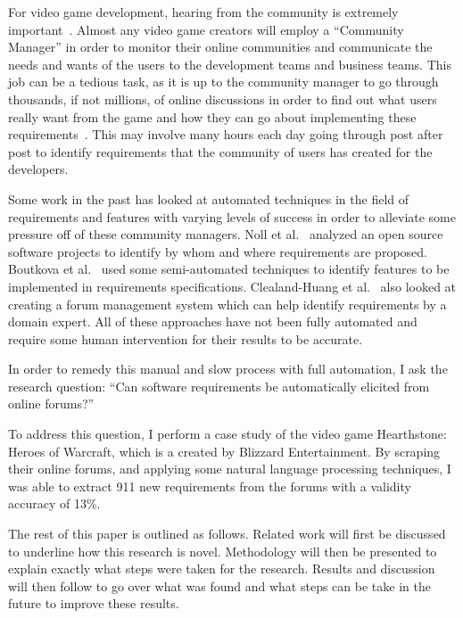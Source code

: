 \documentclass[conference]{IEEEtran}
\begin{document}
For video game development, hearing from the community is extremely important~\cite{Ruggles:2005:OCB}. Almost any
video game creators will employ a ``Community Manager'' in order to monitor their online
communities and communicate the needs and wants of the users to the development teams and
business teams. This job can be a tedious task, as it is up to the community manager to 
go through thousands, if not millions, of online discussions in order to find out what
users really want from the game and how they can go about implementing these 
requirements~\cite{Gottipati:2011:FRA}.
This may involve many hours each day going through post after post to identify requirements
that the community of users has created for the developers.

Some work in the past has looked at automated techniques in the field of requirements and
features with varying levels of success in order to alleviate some
pressure off of these community managers. Noll et al.~\cite{Noll:2010:REO}
analyzed an open source software projects to
identify by whom and where requirements are proposed. Boutkova et al.~\cite{Boutkova}
used some semi-automated
techniques to identify features to be implemented in requirements specifications. Clealand-Huang
et al.~\cite{Cleland-HuangDDC09} also looked at creating a forum management system which can help identify requirements
by a domain expert. All of these approaches have not been fully automated and require some
human intervention for their results to be accurate.

In order to remedy this manual and slow process with full automation, I ask the research question: 
``Can software requirements be automatically elicited from online forums?''

To address this question, I perform a case study of the video game Hearthstone: Heroes of Warcraft,
which is a created by Blizzard Entertainment. By scraping their online forums, and applying some
natural language processing techniques, I was able to extract 911 new requirements from the forums 
with a validity accuracy of 13\%. 

The rest of this paper is outlined as follows. Related work will first be discussed to underline 
how this research is novel. Methodology will then be presented to explain exactly what steps were taken
for the research. Results and discussion will then follow to go over what was found and what steps
can be take in the future to improve these results.
\end{document}

